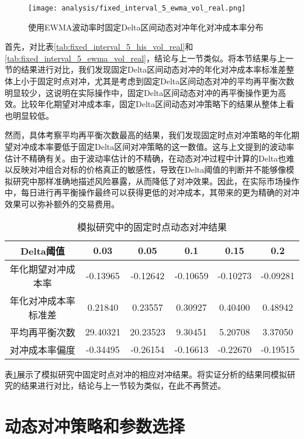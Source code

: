 \begin{figure}[htb]
  \centering
  \texttt{[image: analysis/fixed\_interval\_5\_ewma\_vol\_real.png]}
  \caption[这里将出现在插图索引中]
    {使用EWMA波动率时固定Delta区间动态对冲年化对冲成本率分布}
  \label{fig:fixed_interval_5_ewma_vol_real}
\end{figure}

首先，对比表\ref{tab:fixed_interval_5_his_vol_real}和\ref{tab:fixed_interval_5_ewma_vol_real}，结论与上一节类似。将本节结果与上一节的结果进行对比，我们发现固定Delta区间动态对冲的年化对冲成本率标准差整体上小于固定时点对冲，尤其是考虑到固定Delta区间动态对冲的平均再平衡次数明显较少，这说明在实际操作中，固定Delta区间动态对冲的再平衡操作更为高效。比较年化期望对冲成本率，固定Delta区间动态对冲策略下的结果从整体上看也明显较低。

然而，具体考察平均再平衡次数最高的结果，我们发现固定时点对冲策略的年化期望对冲成本率要低于固定Delta区间对冲策略的这一数值。这与上文提到的波动率估计不精确有关。由于波动率估计的不精确，在动态对冲过程中计算的Delta也难以反映对冲组合对标的价格真正的敏感性，导致在Delta阈值的判断并不能够像模拟研究中那样准确地描述风险暴露，从而降低了对冲效果。因此，在实际市场操作中，每日进行再平衡操作最终可以获得更低的对冲成本，其带来的更为精确的对冲效果可以弥补额外的交易费用。

\begin{table}[htbp]
  \centering
  \caption{模拟研究中的固定时点动态对冲结果}
  \label{tab:fixed_interval_5_sim}
  \begin{tabular}{cccccc}
    \toprule
    Delta阈值 & 0.03 & 0.05 & 0.1 & 0.15 & 0.2 \\
    \midrule
    年化期望对冲成本率 & -0.13965 & -0.12642 & -0.10659 & -0.10273 & -0.09281 \\
    年化对冲成本率标准差 & 0.21840 & 0.23557 & 0.30927 & 0.40400 & 0.48942 \\
    平均再平衡次数 & 29.40321 & 20.23523 & 9.30451 & 5.20708 & 3.37050 \\
    对冲成本率偏度 & -0.34495 & -0.26154 & -0.16613 & -0.22670 & -0.19515 \\
    \bottomrule
  \end{tabular}
\end{table}

表\ref{tab:fixed_interval_5_sim}展示了模拟研究中固定时点对冲的相应对冲结果。将实证分析的结果同模拟研究的结果进行对比，结论与上一节较为类似，在此不再赘述。

\section{动态对冲策略和参数选择}
\label{utility_real}


